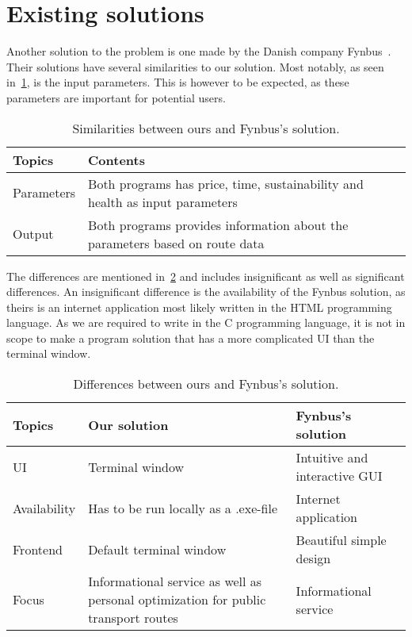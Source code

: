 \section{Existing solutions}\label{existing-solutions}

Another solution to the problem is one made by the Danish company Fynbus~\cite{fynbus2023}.
Their solutions have several similarities to our solution.
Most notably, as seen in~\ref{tab:similarities-between-ours-and-fynbus's-solution}, is the input parameters.
This is however to be expected, as these parameters are important for potential users.

\begin{table}[ht]
    \centering
    \begin{tabular}{|l|p{5cm}|p{5cm}|}
        \hline
        \textbf{Topics} & \textbf{Contents} \\
        \hline
        Parameters & Both programs has price, time, sustainability and health as input parameters \\
        \hline
        Output & Both programs provides information about the parameters based on route data \\
        \hline
    \end{tabular}
    \caption{Similarities between ours and Fynbus's solution.}
    \label{tab:similarities-between-ours-and-fynbus's-solution}
\end{table}

The differences are mentioned in~\ref{tab:differences-between-ours-and-fynbus's-solution} and includes insignificant as
well as significant differences.
An insignificant difference is the availability of the Fynbus solution, as theirs is an internet application most
likely written in the HTML programming language.
As we are required to write in the C programming language, it is not in scope to make a program solution that has a more
complicated UI than the terminal window.

\begin{table}[ht]
    \centering
    \begin{tabular}{|l|p{5cm}|p{5cm}|}
        \hline
        \textbf{Topics} & \textbf{Our solution} & \textbf{Fynbus's solution} \\
        \hline
        UI & Terminal window & Intuitive and interactive GUI \\
        \hline
        Availability & Has to be run locally as a .exe-file & Internet application \\
        \hline
        Frontend & Default terminal window & Beautiful simple design \\
        \hline
        Focus & Informational service as well as personal optimization for public transport routes & Informational service \\
        \hline
    \end{tabular}
    \caption{Differences between ours and Fynbus's solution.}
    \label{tab:differences-between-ours-and-fynbus's-solution}
\end{table}

